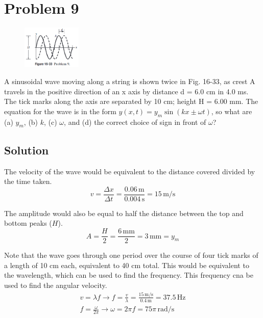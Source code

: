 \documentclass[12pt]{article}
\begin{document}
    \section{Problem 9}
        \begin{figure}
            \vspace{-30pt}
            \includegraphics[width=0.25\textwidth]{picture_16-33.png} 
        \end{figure}
        A sinusoidal wave moving along a string is shown twice in Fig. 16-33, as crest A travels in the positive direction of an x axis by distance d = 6.0 cm in 4.0 ms. 
        The tick marks along the axis are separated by 10 cm; height H = 6.00 mm.
        The equation for the wave is in the form $y(x, t) = y_m \sin(kx \pm \omega t)$, so what are (a) $y_m$, (b) $k$, (c) $\omega$, and (d) the correct choice of sign in front of $\omega$?

        \subsection{Solution}
            The velocity of the wave would be equivalent to the distance covered divided by the time taken.
            \begin{equation}
                v   =   \frac{\Delta x}{\Delta t}
                    =   \frac{0.06\,\unit{\meter}}{0.004\,\unit{\second}}
                    =   15\,\unit{\meter/\second}
            \end{equation}

            The amplitude would also be equal to half the distance between the top and bottom peaks ($H$).
            \begin{equation}
                A   =   \frac{H}{2}
                    =   \frac{6\,\unit{\milli\meter}}{2}
                    =   3\,\unit{\milli\meter}
                    =   y_m
            \end{equation}

            Note that the wave goes through one period over the course of four tick marks of a length of 10 \unit{\centi\meter} each, equivalent to 40 \unit{\centi\meter} total. 
            This would be equivalent to the wavelength, which can be used to find the frequency.
            This frequency cna be used to find the angular velocity.
            \begin{gather}
                v   =   \lambda f \to
                f   =   \frac{v}{\lambda}
                    =   \frac{15\,\unit{\meter/\second}}{0.4\,\unit{\meter}}
                    =   37.5\,\unit{\hertz}\\
                f   =   \frac{\omega}{2\pi} \to
                \omega  =   2\pi f
                    =   75\pi\,\unit{\radian/\second}
            \end{gather}
\end{document}
